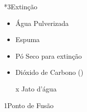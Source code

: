 \begin{sectionBox}
\begin{sectionBox}
\begin{multicols}{2}
            \begin{sectionBox}*3{Extinção}
                \begin{itemize}
                    \item Água Pulverizada
                    \item Espuma
                    \item Pó Seco para extinção
                    \item Dióxido de Carbono ()
                    \item[x] Jato d'água
                \end{itemize}
            \end{sectionBox}

        \end{multicols}
    \end{sectionBox}


\end{sectionBox}



\newpage



\begin{sectionBox}1{Ponto de Fusão}

\end{sectionBox}












